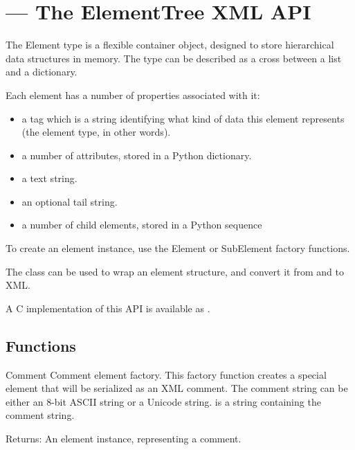 \section{ --- The ElementTree XML API}


The Element type is a flexible container object, designed to store
hierarchical data structures in memory. The type can be described as a
cross between a list and a dictionary.

Each element has a number of properties associated with it:

\begin{itemize}
  \item a tag which is a string identifying what kind of data
        this element represents (the element type, in other words).
  \item a number of attributes, stored in a Python dictionary.
  \item a text string.
  \item an optional tail string.
  \item a number of child elements, stored in a Python sequence
\end{itemize}

To create an element instance, use the Element or SubElement factory
functions.

The  class can be used to wrap an element
structure, and convert it from and to XML.

A C implementation of this API is available as
.


\subsection{Functions\label{elementtree-functions}}

\begin{funcdesc}{Comment}{}
Comment element factory.  This factory function creates a special
element that will be serialized as an XML comment.
The comment string can be either an 8-bit ASCII string or a Unicode
string.
 is a string containing the comment string.

\begin{datadescni}{Returns:}
An element instance, representing a comment.
\end{datadescni}
\end{funcdesc}

